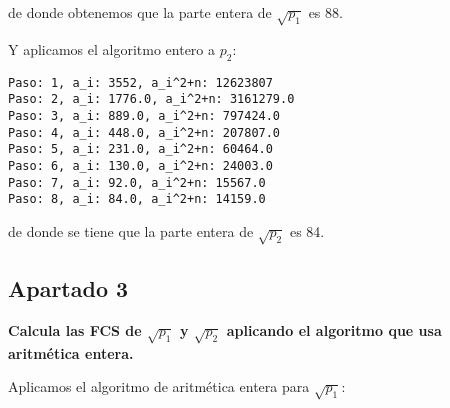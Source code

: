 \documentclass[a4paper]{article}
\begin{document}
de donde obtenemos que la parte entera de $\sqrt{p_1}$ es 88.

Y aplicamos el algoritmo entero a $p_2$:

\begin{verbatim}
Paso: 1, a_i: 3552, a_i^2+n: 12623807
Paso: 2, a_i: 1776.0, a_i^2+n: 3161279.0
Paso: 3, a_i: 889.0, a_i^2+n: 797424.0
Paso: 4, a_i: 448.0, a_i^2+n: 207807.0
Paso: 5, a_i: 231.0, a_i^2+n: 60464.0
Paso: 6, a_i: 130.0, a_i^2+n: 24003.0
Paso: 7, a_i: 92.0, a_i^2+n: 15567.0
Paso: 8, a_i: 84.0, a_i^2+n: 14159.0
\end{verbatim}

de donde se tiene que la parte entera de $\sqrt{p_2}$ es 84.

\subsection{Apartado 3}

\textbf{Calcula las FCS de $\sqrt{p_1}$ y $\sqrt{p_2}$ aplicando el algoritmo que usa aritmética entera.}

Aplicamos el algoritmo de aritmética entera para $\sqrt{p_1}$:
\end{document}
